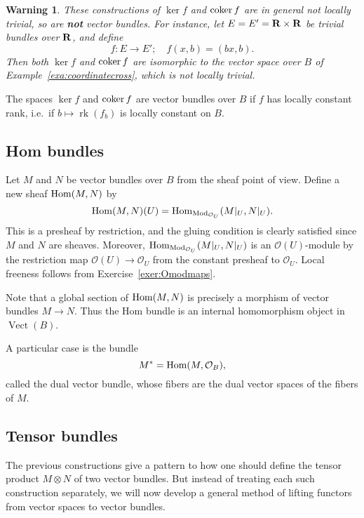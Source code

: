 \documentclass[a4paper,openany]{scrbook}
\DeclareMathOperator{\Vect}{Vect}
\DeclareMathOperator{\rk}{rk}
\newtheorem{warning}[equation]{Warning}
\begin{document}
\begin{warning}
These constructions of $\ker f$ and $\operatorname{coker} f$ are in general not locally trivial, so are \textbf{not} vector bundles. For instance, let $E=E'=\mathbf R\times \mathbf R$ be trivial bundles over $\mathbf R$, and define
\[
f\colon E \to E'; \quad f(x,b) = (bx,b).
\]
Then both $\ker f$ and $\operatorname{coker} f$ are isomorphic to the vector space over $B$ of Example~\ref{exa:coordinatecross}, which is not locally trivial.
\end{warning}


\begin{exer}
The spaces $\ker f$ and $\operatorname{coker} f$ are vector bundles over $B$ if $f$ has locally constant rank, i.e.\ if $b \mapsto \rk(f_b)$ is locally constant on $B$.
\end{exer}

\subsection{Hom bundles}

Let $M$ and $N$ be vector bundles over $B$ from the sheaf point of view. Define a new sheaf $\operatorname{Hom}(M,N)$ by
\[
\operatorname{Hom}(M,N)(U) = \operatorname{Hom}_{\operatorname{Mod}_{\mathcal O_U}}(M|_U,N|_U).
\]
This is a presheaf by restriction, and the gluing condition is clearly satisfied since $M$ and $N$ are sheaves. Moreover, $\operatorname{Hom}_{\operatorname{Mod}_{\mathcal O_U}}(M|_U,N|_U)$ is an $\mathcal O(U)$-module by the restriction map $\mathcal O(U) \to \mathcal O_U$ from the constant presheaf to $\mathcal O_U$. Local freeness follows from Exercise~\ref{exer:Omodmaps}.

Note that a global section of $\operatorname{Hom}(M,N)$ is precisely a morphism of vector bundles $M \to N$. Thus the Hom bundle is an internal homomorphism object in $\Vect(B)$.

A particular case is the bundle
\[
M^* = \operatorname{Hom}(M,\mathcal O_B),
\]
called the dual vector bundle, whose fibers are the dual vector spaces of the fibers of $M$.

\subsection{Tensor bundles}

The previous constructions give a pattern to how one should define the tensor product $M \otimes N$ of two vector bundles. But instead of treating each such construction separately, we will now develop a general method of lifting functors from vector spaces to vector bundles.
\end{document}
